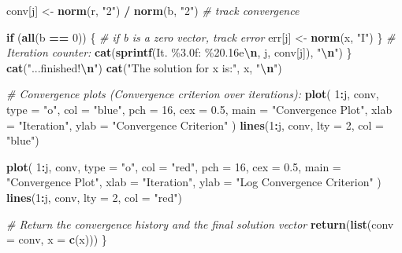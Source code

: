 \documentclass[
]{article}
\newenvironment{Shaded}{\begin{snugshade}}{\end{snugshade}}
\newcommand{\AttributeTok}[1]{\textcolor[rgb]{0.13,0.29,0.53}{#1}}
\newcommand{\CommentTok}[1]{\textcolor[rgb]{0.56,0.35,0.01}{\textit{#1}}}
\newcommand{\ControlFlowTok}[1]{\textcolor[rgb]{0.13,0.29,0.53}{\textbf{#1}}}
\newcommand{\DecValTok}[1]{\textcolor[rgb]{0.00,0.00,0.81}{#1}}
\newcommand{\FloatTok}[1]{\textcolor[rgb]{0.00,0.00,0.81}{#1}}
\newcommand{\FunctionTok}[1]{\textcolor[rgb]{0.13,0.29,0.53}{\textbf{#1}}}
\newcommand{\NormalTok}[1]{#1}
\newcommand{\OtherTok}[1]{\textcolor[rgb]{0.56,0.35,0.01}{#1}}
\newcommand{\SpecialCharTok}[1]{\textcolor[rgb]{0.81,0.36,0.00}{\textbf{#1}}}
\newcommand{\StringTok}[1]{\textcolor[rgb]{0.31,0.60,0.02}{#1}}
\begin{document}
\begin{Shaded}
\begin{Highlighting}[]
\NormalTok{    conv[j] }\OtherTok{\textless{}{-}} \FunctionTok{norm}\NormalTok{(r, }\StringTok{"2"}\NormalTok{) }\SpecialCharTok{/} \FunctionTok{norm}\NormalTok{(b, }\StringTok{"2"}\NormalTok{)  }\CommentTok{\# track convergence}
    
    \ControlFlowTok{if}\NormalTok{ (}\FunctionTok{all}\NormalTok{(b }\SpecialCharTok{==} \DecValTok{0}\NormalTok{)) \{}
      \CommentTok{\# if b is a zero vector, track error}
\NormalTok{      err[j] }\OtherTok{\textless{}{-}} \FunctionTok{norm}\NormalTok{(x, }\StringTok{"I"}\NormalTok{)}
\NormalTok{    \}}
    \CommentTok{\# Iteration counter:}
    \FunctionTok{cat}\NormalTok{(}\FunctionTok{sprintf}\NormalTok{(}\StringTok{\textquotesingle{}It. \%3.0f: \%20.16e}\SpecialCharTok{\textbackslash{}n}\StringTok{\textquotesingle{}}\NormalTok{, j, conv[j]), }\StringTok{"}\SpecialCharTok{\textbackslash{}n}\StringTok{"}\NormalTok{)}
\NormalTok{  \}}
  \FunctionTok{cat}\NormalTok{(}\StringTok{"...finished!}\SpecialCharTok{\textbackslash{}n}\StringTok{"}\NormalTok{)}
  \FunctionTok{cat}\NormalTok{(}\StringTok{"The solution for x is:"}\NormalTok{, x, }\StringTok{"}\SpecialCharTok{\textbackslash{}n}\StringTok{"}\NormalTok{)}
  
  \CommentTok{\# Convergence plots (Convergence criterion over iterations):}
  \FunctionTok{plot}\NormalTok{(}
    \DecValTok{1}\SpecialCharTok{:}\NormalTok{j,}
\NormalTok{    conv,}
    \AttributeTok{type =} \StringTok{"o"}\NormalTok{,}
    \AttributeTok{col =} \StringTok{"blue"}\NormalTok{,}
    \AttributeTok{pch =} \DecValTok{16}\NormalTok{,}
    \AttributeTok{cex =} \FloatTok{0.5}\NormalTok{,}
    \AttributeTok{main =} \StringTok{"Convergence Plot"}\NormalTok{,}
    \AttributeTok{xlab =} \StringTok{"Iteration"}\NormalTok{,}
    \AttributeTok{ylab =} \StringTok{"Convergence Criterion"}
\NormalTok{  )}
  \FunctionTok{lines}\NormalTok{(}\DecValTok{1}\SpecialCharTok{:}\NormalTok{j, conv, }\AttributeTok{lty =} \DecValTok{2}\NormalTok{, }\AttributeTok{col =} \StringTok{"blue"}\NormalTok{)}
  
  \FunctionTok{plot}\NormalTok{(}
    \DecValTok{1}\SpecialCharTok{:}\NormalTok{j,}
\NormalTok{    conv,}
    \AttributeTok{type =} \StringTok{"o"}\NormalTok{,}
    \AttributeTok{col =} \StringTok{"red"}\NormalTok{,}
    \AttributeTok{pch =} \DecValTok{16}\NormalTok{,}
    \AttributeTok{cex =} \FloatTok{0.5}\NormalTok{,}
    \AttributeTok{main =} \StringTok{"Convergence Plot"}\NormalTok{,}
    \AttributeTok{xlab =} \StringTok{"Iteration"}\NormalTok{,}
    \AttributeTok{ylab =} \StringTok{"Log Convergence Criterion"}
\NormalTok{  )}
  \FunctionTok{lines}\NormalTok{(}\DecValTok{1}\SpecialCharTok{:}\NormalTok{j, conv, }\AttributeTok{lty =} \DecValTok{2}\NormalTok{, }\AttributeTok{col =} \StringTok{"red"}\NormalTok{)}
  
  \CommentTok{\# Return the convergence history and the final solution vector}
  \FunctionTok{return}\NormalTok{(}\FunctionTok{list}\NormalTok{(}\AttributeTok{conv =}\NormalTok{ conv, }\AttributeTok{x =} \FunctionTok{c}\NormalTok{(x)))}
\NormalTok{\}}
\end{Highlighting}
\end{Shaded}
\end{document}
